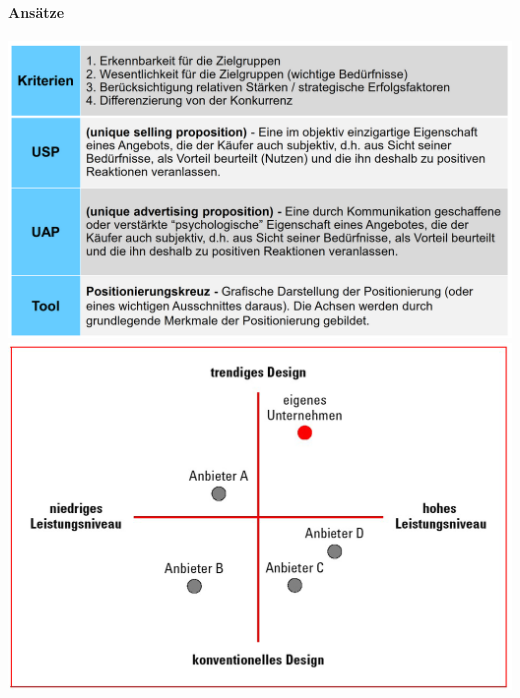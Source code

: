\paragraph{Ansätze}
\begin{multicols}{2}
	\includegraphics[width=1\linewidth]{images/ansatz_positionierung}
	\includegraphics[width=0.9\linewidth]{images/positionierungskreuz}
\end{multicols}

